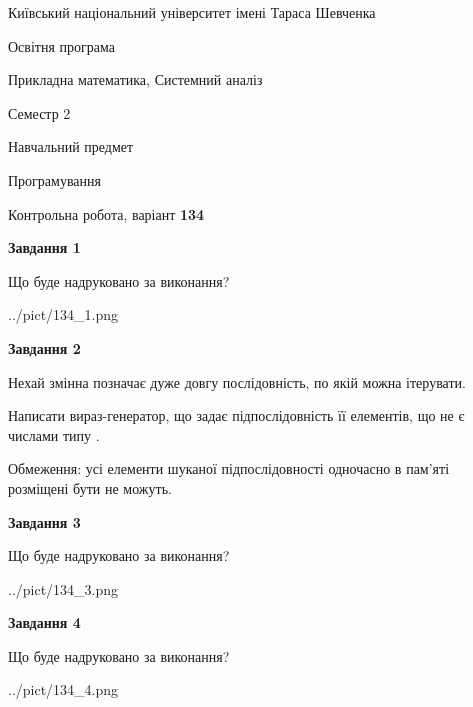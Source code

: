 \documentclass[12pt, ukrainian]{article}
\begin{document}
{{\begin {small}\par
{ \center  Київський національний університет імені Тараса Шевченка \par}
{\parbox {5 cm}{Освітня програма \hfill}{\parbox {8 cm}{Прикладна математика, Системний аналіз \hfill}}\parbox {5 cm}{\hfill Семестр 2}}\par
{\parbox {5 cm} {Навчальний предмет \hfill}\parbox {7 cm}{Програмування \hfill}\parbox {6cm}{\hfill}\par}\vspace{-7pt} \end{small}}{\center Контрольна робота, варіант  \No \textbf
{ 134 }\par}}
{
\begin {large}
{\begin {center}\textbf{Завдання 1}\end {center}}\par
Що буде надруковано за виконання?\par\par
\begin{center}
	{../pict/134_1.png}
\end{center}
\newpage

{\begin {center}\textbf{Завдання 2}\end {center}}\par
Нехай змінна  позначає дуже довгу послідовність, по якій можна ітерувати.

Написати вираз-генератор, що задає підпослідовність її елементів, що не є числами типу .

Обмеження: усі елементи шуканої підпослідовності одночасно в пам'яті розміщені бути не можуть.\par
\newpage

{\begin {center}\textbf{Завдання 3}\end {center}}\par
Що буде надруковано за виконання?
\begin{center}
	{../pict/134_3.png}
\end{center}
\newpage

{\begin {center}\textbf{Завдання 4}\end {center}}\par
Що буде надруковано за виконання?\par
\begin{center}
	{../pict/134_4.png}
\end{center}
\newpage


\end{large}}
\end{document}
